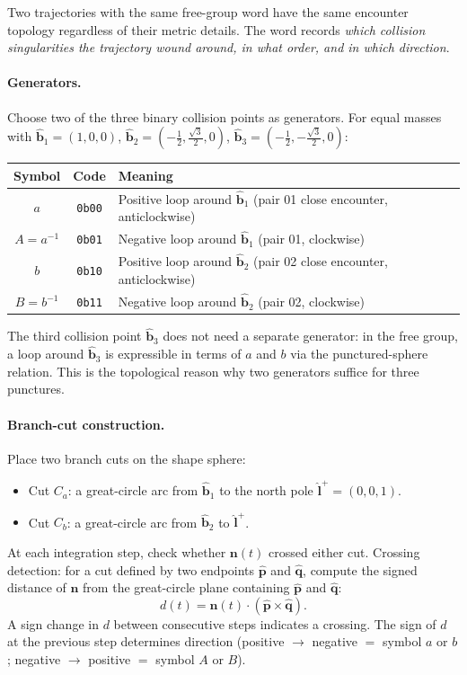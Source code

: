 \documentclass[11pt]{report}
\begin{document}
Two trajectories with the same free-group word have the same encounter topology regardless of their metric details. The word records \emph{which collision singularities the trajectory wound around, in what order, and in which direction}.

\paragraph{Generators.} Choose two of the three binary collision points as generators. For equal masses with $\hat{\mathbf b}_1=(1,0,0)$, $\hat{\mathbf b}_2=(-\tfrac{1}{2},\tfrac{\sqrt3}{2},0)$, $\hat{\mathbf b}_3=(-\tfrac{1}{2},-\tfrac{\sqrt3}{2},0)$:

\begin{center}
\begin{tabular}{ccl}
\toprule
Symbol & Code & Meaning \\
\midrule
$a$ & \texttt{0b00} & Positive loop around $\hat{\mathbf b}_1$ (pair 01 close encounter, anticlockwise) \\
$A=a^{-1}$ & \texttt{0b01} & Negative loop around $\hat{\mathbf b}_1$ (pair 01, clockwise) \\
$b$ & \texttt{0b10} & Positive loop around $\hat{\mathbf b}_2$ (pair 02 close encounter, anticlockwise) \\
$B=b^{-1}$ & \texttt{0b11} & Negative loop around $\hat{\mathbf b}_2$ (pair 02, clockwise) \\
\bottomrule
\end{tabular}
\end{center}

The third collision point $\hat{\mathbf b}_3$ does not need a separate generator: in the free group, a loop around $\hat{\mathbf b}_3$ is expressible in terms of $a$ and $b$ via the punctured-sphere relation. This is the topological reason why two generators suffice for three punctures.

\paragraph{Branch-cut construction.} Place two branch cuts on the shape sphere:
\begin{itemize}[nosep]
\item Cut $C_a$: a great-circle arc from $\hat{\mathbf b}_1$ to the north pole $\hat{\mathbf l}^+=(0,0,1)$.
\item Cut $C_b$: a great-circle arc from $\hat{\mathbf b}_2$ to $\hat{\mathbf l}^+$.
\end{itemize}
At each integration step, check whether $\mathbf n(t)$ crossed either cut. Crossing detection: for a cut defined by two endpoints $\hat{\mathbf p}$ and $\hat{\mathbf q}$, compute the signed distance of $\mathbf n$ from the great-circle plane containing $\hat{\mathbf p}$ and $\hat{\mathbf q}$:
\[
d(t) = \mathbf n(t)\cdot(\hat{\mathbf p}\times\hat{\mathbf q}).
\]
A sign change in $d$ between consecutive steps indicates a crossing. The sign of $d$ at the previous step determines direction (positive $\to$ negative $=$ symbol $a$ or $b$; negative $\to$ positive $=$ symbol $A$ or $B$).
\end{document}
